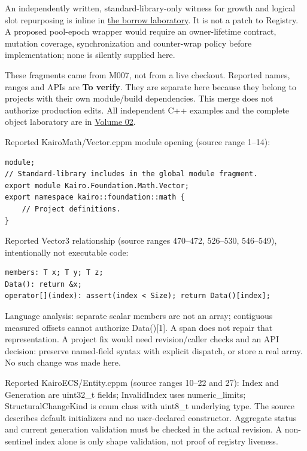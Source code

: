 An independently written, standard-library-only witness for growth and logical slot repurposing is inline in \hyperref[01-foundations-i-ch004-complete-runnable-borrow-laboratory]{the borrow laboratory}. It is not a patch to Registry. A proposed pool-epoch wrapper would require an owner-lifetime contract, mutation coverage, synchronization and counter-wrap policy before implementation; none is silently supplied here.

These fragments came from M007, not from a live checkout. Reported names, ranges and APIs are \textbf{To verify}. They are separate here because they belong to projects with their own module/build dependencies. This merge does not authorize production edits. All independent C++ examples and the complete object laboratory are in \href{Continuous\%20Notes/Computing\%20Foundations\%20-\%20From\%20Bits\%20to\%20C++\%20and\%20Systems\%20APIs}{Volume 02}.

Reported KairoMath/Vector.cppm module opening (source range 1--14):

\begin{verbatim}
module;
// Standard-library includes in the global module fragment.
export module Kairo.Foundation.Math.Vector;
export namespace kairo::foundation::math {
    // Project definitions.
}
\end{verbatim}

Reported Vector3 relationship (source ranges 470--472, 526--530, 546--549), intentionally not executable code:

\begin{verbatim}
members: T x; T y; T z;
Data(): return &x;
operator[](index): assert(index < Size); return Data()[index];
\end{verbatim}

Language analysis: separate scalar members are not an array; contiguous measured offsets cannot authorize Data(){[}1{]}. A span does not repair that representation. A project fix would need revision/caller checks and an API decision: preserve named-field syntax with explicit dispatch, or store a real array. No such change was made here.

Reported KairoECS/Entity.cppm (source ranges 10--22 and 27): Index and Generation are uint32\_t fields; InvalidIndex uses numeric\_limits; StructuralChangeKind is enum class with uint8\_t underlying type. The source describes default initializers and no user-declared constructor. Aggregate status and current generation validation must be checked in the actual revision. A non-sentinel index alone is only shape validation, not proof of registry liveness.

